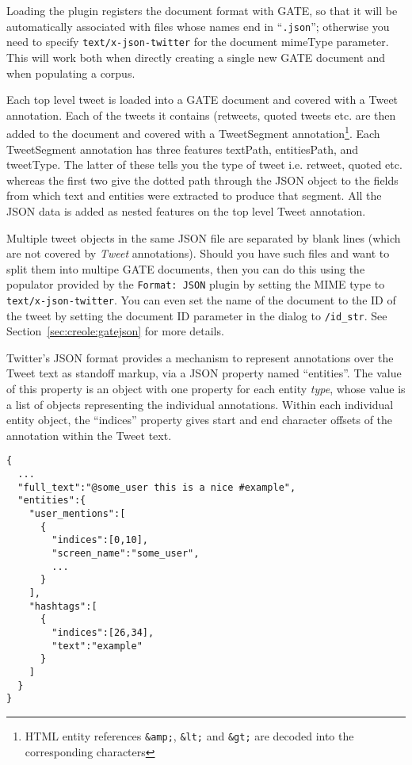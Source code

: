 Loading the plugin registers the
document format with GATE, so that it will be automatically associated with
files whose names end in ``\verb!.json!''; otherwise you need to specify
\verb!text/x-json-twitter! for the document mimeType parameter.  This will work
both when directly creating a single new GATE document and when populating a
corpus.

Each top level tweet is loaded into a GATE document and covered with a Tweet annotation.
Each of the tweets it contains (retweets, quoted tweets etc. are then added to the document
and covered with a TweetSegment annotation\footnote{HTML entity references \texttt{\&amp;}, \texttt{\&lt;} and
\texttt{\&gt;} are decoded into the corresponding characters}. Each TweetSegment annotation has three features
textPath, entitiesPath, and tweetType. The latter of these tells you the type of tweet i.e.
retweet, quoted etc. whereas the first two give the dotted path through the JSON object
to the fields from which text and entities were extracted to produce that segment.
All the JSON data is added as nested features on the top level Tweet annotation.

Multiple tweet objects in the same JSON file are separated by blank lines (which
are not covered by \emph{Tweet} annotations). Should you have such files and
want to split them into multipe GATE documents, then you can do this using the
populator provided by the \verb!Format: JSON! plugin by setting the MIME type
to \verb!text/x-json-twitter!. You can even set the name of the document to the
ID of the tweet by setting the document ID parameter in the dialog to \verb!/id_str!.
See Section~\ref{sec:creole:gatejson} for more details.


Twitter's JSON format provides a mechanism to represent annotations over the
Tweet text as standoff markup, via a JSON property named ``entities''.  The
value of this property is an object with one property for each entity
\emph{type}, whose value is a list of objects representing the individual
annotations.  Within each individual entity object, the ``indices'' property
gives start and end character offsets of the annotation within the Tweet text.

\begin{verbatim}
{
  ...
  "full_text":"@some_user this is a nice #example",
  "entities":{
    "user_mentions":[
      {
        "indices":[0,10],
        "screen_name":"some_user",
        ...
      }
    ],
    "hashtags":[
      {
        "indices":[26,34],
        "text":"example"
      }
    ]
  }
}
\end{verbatim}


